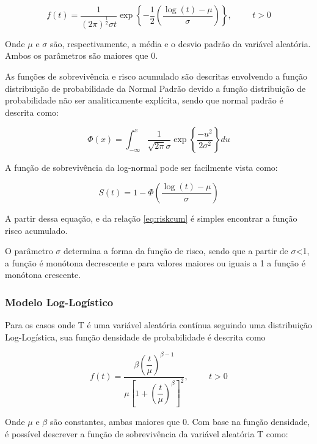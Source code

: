 \begin{equation}
 f(t) = \dfrac{1}{(2\pi)^{\frac{1}{2}}\sigma t}\exp\left\lbrace -\dfrac{1}{2} \left( \dfrac{\log(t) - \mu}{\sigma} \right) \right\rbrace, \hspace{1cm} t > 0
\end{equation}

Onde $\mu$ e $\sigma$ são, respectivamente, a média e o desvio padrão da variável aleatória. Ambos os parâmetros são maiores que 0.

As funções de sobrevivência e risco acumulado são descritas envolvendo a função distribuição de probabilidade da Normal Padrão devido a função distribuição de probabilidade não ser analiticamente explícita, sendo que normal padrão é descrita como:

$$ \Phi(x) =  \int_{-\infty}^{x} \dfrac{1}{\sqrt{2\pi}\sigma} \exp \left\lbrace \dfrac{-u^2}{2\sigma^2} \right\rbrace du $$

A função de sobrevivência da log-normal pode ser facilmente vista como:

\begin{equation} \label{eq:LNSurv}
 S(t) = 1 - \Phi\left(\dfrac{\log(t) - \mu}{\sigma}\right)
\end{equation}

A partir dessa equação, e da relação \ref{eq:riskcum} é simples encontrar a função risco acumulado.

O parâmetro $\sigma$ determina a forma da função de risco, sendo que a partir de $\sigma$<1, a função é monótona decrescente e para valores maiores ou iguais a 1 a função é monótona crescente.

\subsubsection*{Modelo Log-Logístico}

Para os casos onde T é uma variável aleatória contínua seguindo uma distribuição Log-Logística, sua função densidade de probabilidade é descrita como

\begin{equation}
  f(t) = \dfrac{\beta\left(\dfrac{t}{\mu}\right)^{\beta - 1}}{\mu\left[1+\left(\dfrac{t}{\mu}\right)^{\beta}\right]^2}, \hspace{1cm} t > 0
\end{equation}

Onde $\mu$ e $\beta$ são constantes, ambas maiores que 0. Com base na função densidade, é possível descrever a função de sobrevivência da variável aleatória T como:

